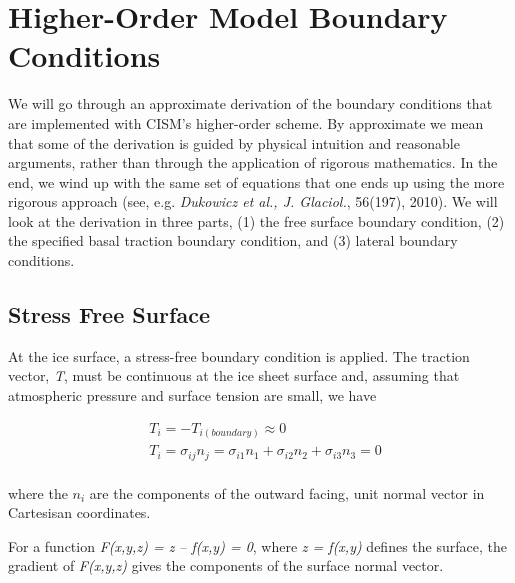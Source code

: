 %
%
%
%
%

\section{Higher-Order Model Boundary Conditions}

We will go through an approximate derivation of the boundary conditions that are implemented with CISM's higher-order scheme. By approximate we mean that some of the derivation is guided by physical intuition and reasonable arguments, rather than through the application of rigorous mathematics. In the end, we wind up with the same set of equations that one ends up using the more rigorous approach (see, e.g. \textit{Dukowicz et al., J. Glaciol.}, 56(197), 2010). We will look at the derivation in three parts, (1) the free surface boundary condition, (2) the specified basal traction boundary condition, and (3) lateral boundary conditions.

\subsection{Stress Free Surface}
At the ice surface, a stress-free boundary condition is applied. The traction vector, \textit{{\large T}}, must be continuous at the ice sheet surface and, assuming that atmospheric pressure and surface tension are small, we have

\begin{align*}
 & T_{i}=-T_{i(boundary)}\approx 0 \\ 
 & T_{i}=\sigma _{ij}n_{j}=\sigma _{i1}n_{1}+\sigma _{i2}n_{2}+\sigma _{i3}n_{3}=0\\
\end{align*}

where the $n_i$ are the components of the outward facing, unit normal vector in Cartesisan coordinates.

For a function \textit{F(x,y,z) = z -- f(x,y) = 0}, where \textit{z = f(x,y)} defines the surface, the gradient of \textit{F(x,y,z)} gives the components of the surface normal vector.

